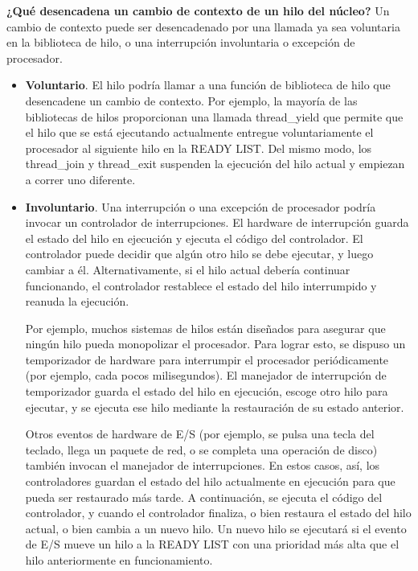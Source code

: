 \documentclass[10pt]{book}
\begin{document}
\textbf{¿Qué desencadena un cambio de contexto de un hilo del núcleo?} Un cambio de contexto puede ser desencadenado por una llamada ya sea voluntaria en la biblioteca de hilo, o una interrupción involuntaria o excepción de procesador.
\begin{itemize}
\item \textbf{Voluntario}. El hilo podría llamar a una función de biblioteca de hilo que desencadene un cambio de contexto. Por ejemplo, la mayoría de las bibliotecas de hilos proporcionan una llamada {\mf thread\_yield} que permite que el hilo que se está ejecutando actualmente entregue voluntariamente el procesador al siguiente hilo en la READY LIST. Del mismo modo, los {\mf thread\_join} y {\mf thread\_exit} suspenden la ejecución del hilo actual y empiezan a correr uno diferente.

\item \textbf{Involuntario}. Una interrupción o una excepción de procesador podría invocar un controlador de interrupciones. El hardware de interrupción guarda el estado del hilo en ejecución y ejecuta el código del controlador. El controlador puede decidir que algún otro hilo se debe ejecutar, y luego cambiar a él. Alternativamente, si el hilo actual debería continuar funcionando, el controlador restablece el estado del hilo interrumpido y reanuda la ejecución.

Por ejemplo, muchos sistemas de hilos están diseñados para asegurar que ningún hilo pueda monopolizar el procesador. Para lograr esto, se dispuso un temporizador de hardware para interrumpir el procesador periódicamente (por ejemplo, cada pocos milisegundos). El manejador de interrupción de temporizador guarda el estado del hilo en ejecución, escoge otro hilo para ejecutar, y se ejecuta ese hilo mediante la restauración de su estado anterior.

Otros eventos de hardware de E/S (por ejemplo, se pulsa una tecla del teclado, llega un paquete de red, o se completa una operación de disco) también invocan el manejador de interrupciones. En estos casos, así, los controladores guardan el estado del hilo actualmente en ejecución para que pueda ser restaurado más tarde. A continuación, se ejecuta el código del controlador, y cuando el controlador finaliza, o bien restaura el estado del hilo actual, o bien cambia a un nuevo hilo. Un nuevo hilo se ejecutará si el evento de E/S mueve un hilo a la READY LIST con una prioridad más alta que el hilo anteriormente en funcionamiento.
\end{itemize}
\end{document}

